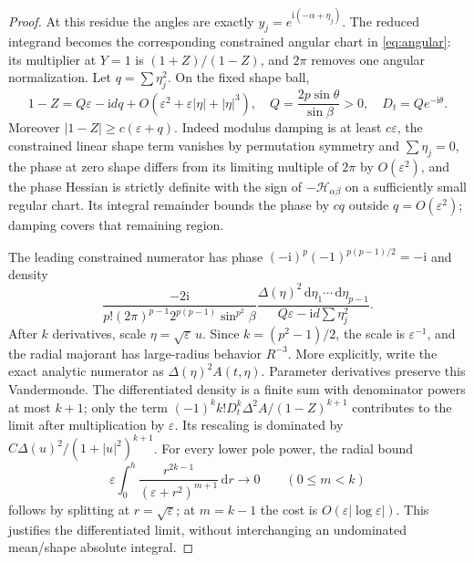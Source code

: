 \documentclass[11pt]{article}
\numberwithin{equation}{section}
\theoremstyle{definition}
\newcommand{\dd}{\,\mathrm d}
\newcommand{\ii}{\mathrm i}
\newcommand{\eps}{\varepsilon}
\newcommand{\Hpair}{\mathcal H_{\alpha\beta}}
\begin{document}
\begin{proof}
At this residue the angles are exactly $y_j=e^{\ii(-\alpha+\eta_j)}$.
The reduced integrand becomes the corresponding constrained
angular chart in \eqref{eq:angular}: its multiplier at $Y=1$ is
$(1+Z)/(1-Z)$, and $2\pi$ removes one angular normalization.
Let $q=\sum\eta_j^2$. On the fixed shape ball,
\begin{equation}
 1-Z=Q\eps-\ii d q+
 O(\eps^2+\eps|\eta|+|\eta|^3),\quad
 Q=\frac{2p\sin\theta}{\sin\beta}>0,
 \quad D_t=Qe^{-\ii\theta}.
 \label{eq:localdenom}
\end{equation}
Moreover $|1-Z|\ge c(\eps+q)$. Indeed modulus damping is at
least $c\eps$, the constrained linear shape term vanishes by
permutation symmetry and $\sum\eta_j=0$, the phase at zero shape
differs from its limiting multiple of $2\pi$ by $O(\eps^2)$,
and the phase Hessian is
strictly definite with the sign of $-\Hpair$ on a sufficiently
small regular chart. Its integral remainder bounds the phase by
$cq$ outside $q=O(\eps^2)$; damping covers that remaining region.

The leading constrained numerator has phase
$(-\ii)^p(-1)^{p(p-1)/2}=-\ii$ and density
\[
 \frac{-2\ii}{p!(2\pi)^{p-1}2^{p(p-1)}\sin^{p^2}\beta}
 \frac{\Delta(\eta)^2\dd\eta_1\cdots\dd\eta_{p-1}}
 {Q\eps-\ii d\sum\eta_j^2}.
\]
After $k$ derivatives, scale $\eta=\sqrt\eps\,u$. Since
$k=(p^2-1)/2$, the scale is $\eps^{-1}$, and the radial
majorant has large-radius behavior $R^{-3}$. More explicitly,
write the exact analytic numerator as $\Delta(\eta)^2A(t,\eta)$.
Parameter derivatives preserve this Vandermonde. The differentiated
density is a finite sum with denominator powers at most $k+1$;
only the term $(-1)^k k!D_t^k\Delta^2A/(1-Z)^{k+1}$ contributes
to the limit after multiplication by $\eps$. Its rescaling is
dominated by $C\Delta(u)^2/(1+|u|^2)^{k+1}$.
For every lower pole power, the radial bound
\[
 \eps\int_0^h\frac{r^{2k-1}}{(\eps+r^2)^{m+1}}\dd r
 \longrightarrow0\qquad(0\le m<k)
\]
follows by splitting at $r=\sqrt\eps$; at $m=k-1$ the cost is
$O(\eps|\log\eps|)$. This justifies the differentiated limit,
without interchanging an undominated mean/shape absolute integral.


\end{proof}
\end{document}
